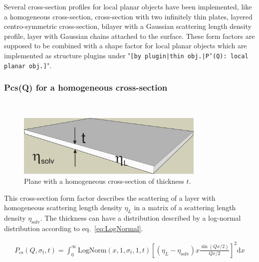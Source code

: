 Several cross-section profiles for local planar objects have been implemented,
like a homogeneous cross-section,
cross-section with two infinitely thin plates,
layered centro-symmetric cross-section,
bilayer with a Gaussian scattering length density profile,
layer with Gaussian chains attached to the surface.
These form factors are supposed to be combined with a shape factor for
local planar objects which are implemented as structure  plugins
under "\texttt{[by plugin|thin obj.|P'(Q): local planar
obj.]}".

\clearpage

\subsubsection{Pcs(Q) for a homogeneous cross-section}
\label{plugin:Pcs:homogeneousXS} ~\\

\begin{figure}[htb]
\begin{center}
\includegraphics[width=0.802\textwidth,height=0.265\textwidth]{../images/form_factor/anisotropic/Pcs_homogeneousXS_txt.png}
\end{center}
\caption{Plane with a homogeneous cross-section of thickness $t$.}
\label{fig:homogeneousXS}
\end{figure}

This cross-section form factor describes the scattering of a layer with homogeneous
scattering length density $\eta_L$ in a matrix of a scattering length density $\eta_\textrm{solv}$.
The thickness can have a distribution described by a log-normal distribution according to eq.\ \ref{eq:LogNormal}.

\begin{align}
P_\text{cs}(Q,\sigma_{t},t) = \int_0^\infty \textrm{LogNorm}(x,1,\sigma_{t},1,t)
    \left[ \left(\eta_L-\eta_\textrm{solv}\right) x \frac{\sin(Qx/2)}{Qx/2} \right]^2\textrm{d}x
\label{eq:PcsHomogeneousPlate}
\end{align}

\vspace{5mm}

